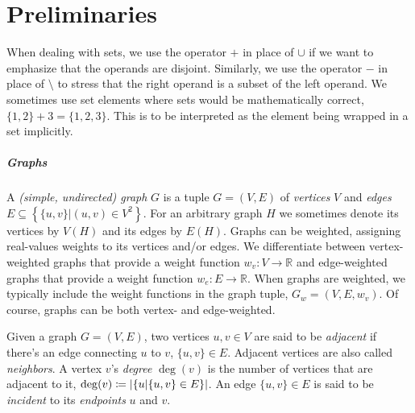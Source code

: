 \chapter{Preliminaries}
\label{chap:preliminaries}



When dealing with sets, we use the operator $+$ in place of $\cup$ if we want to emphasize that the operands are disjoint.
Similarly, we use the operator $-$ in place of $\setminus$ to stress that the right operand is a subset of the left operand.
We sometimes use set elements where sets would be mathematically correct, \eg{} $\{1,2\} + 3 = \{1,2,3\}$.
This is to be interpreted as the element being wrapped in a set implicitly.


\paragraph{Graphs}

A \emph{(simple, undirected) graph} $G$ is a tuple $G = (V, E)$ of \emph{vertices} $V$ and \emph{edges} $E \subseteq \left\{\{u,v\} \vert (u,v) \in V^2 \right\}$.
For an arbitrary graph $H$ we sometimes denote its vertices by $V(H)$ and its edges by $E(H)$.
Graphs can be weighted, assigning real-values weights to its vertices and/or edges.
We differentiate between vertex-weighted graphs that provide a weight function $w_v \colon V \to \mathbb{R}$ and edge-weighted graphs that provide a weight function $w_e \colon E \to \mathbb{R}$.
When graphs are weighted, we typically include the weight functions in the graph tuple, \eg{} $G_w = (V,E,w_v)$.
Of course, graphs can be both vertex- and edge-weighted.

Given a graph $G = (V, E)$, two vertices $u, v \in V$ are said to be \emph{adjacent} if there's an edge connecting $u$ to $v$, \ie{} $\{u, v\} \in E$.
Adjacent vertices are also called \emph{neighbors}.
A vertex $v$'s \emph{degree} $\deg(v)$ is the number of vertices that are adjacent to it, \ie{} $\deg(v) \coloneqq \left\lvert\{u \vert \{u,v\} \in E\}\right\rvert$.
An edge $\{u, v\} \in E$ is said to be \emph{incident} to its \emph{endpoints} $u$ and $v$.

